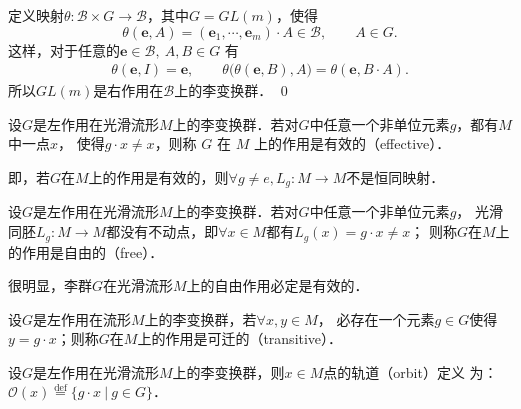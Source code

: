 定义映射$\theta: \mathscr{B} \times G \rightarrow \mathscr{B}$，其中$G=GL(m)$，使得
\begin{equation*}
    \theta(\boldsymbol{e}, A)=\left(\boldsymbol{e}_1, \cdots, 
    \boldsymbol{e}_m\right) \cdot A \in \mathscr{B},\qquad A\in G .
\end{equation*}
这样，对于任意的$\boldsymbol{e} \in \mathscr{B},\ A, B \in G$ 有
\begin{align*}
    \theta(\boldsymbol{e}, I) =\boldsymbol{e}, \qquad
    \theta\bigl(\theta(\boldsymbol{e}, B), A\bigr)  
    =\theta(\boldsymbol{e}, B \cdot A).
\end{align*}
所以$GL(m)$是右作用在$\mathscr{B}$上的李变换群．
\qed


\begin{definition}
    设$G$是左作用在光滑流形$M$上的李变换群．若对$G$中任意一个非单位元素$g$，都有$M$中一点$x$，
    使得$g \cdot x \neq x$，则称 $G$ 在 $M$ 上的作用是{\heiti  有效的}（effective）．
\end{definition}

即，若$G$在$M$上的作用是有效的，则$\forall g \neq e, L_{g}: M \rightarrow M$不是恒同映射．


\begin{definition}
    设$G$是左作用在光滑流形$M$上的李变换群．若对$G$中任意一个非单位元素$g$，
    光滑同胚$L_g: M \rightarrow M$都没有不动点，即$\forall x \in M$都有$L_g(x)=g \cdot x \neq x$；
    则称$G$在$M$上的作用是{\heiti 自由的}（free）．
\end{definition}


很明显，李群$G$在光滑流形$M$上的自由作用必定是有效的． 


\begin{definition}
    设$G$是左作用在流形$M$上的李变换群，若$\forall x, y \in M$，
    必存在一个元素$g \in G$使得$y=g \cdot x$；则称$G$在$M$上的作用是{\heiti 可迁的}（transitive）．    
\end{definition}



\begin{definition}
    设$G$是左作用在光滑流形$M$上的李变换群，则$x \in M$点的{\heiti 轨道}（orbit）定义
    为：$\mathcal{O}(x) \overset{\mathrm {def}}{=} \{ g\cdot x \ | \  g\in G \}$．
\end{definition}

